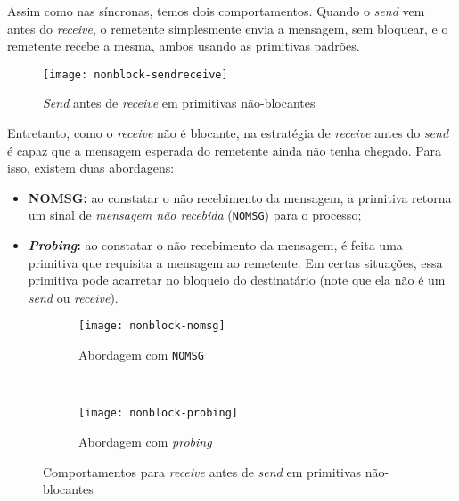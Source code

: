 Assim como nas síncronas, temos dois comportamentos. Quando o \textit{send} vem antes do \textit{receive}, o remetente simplesmente envia a mensagem, sem bloquear, e o remetente recebe a mesma, ambos usando as primitivas padrões.

\begin{figure}[ht]
  \centering
  \texttt{[image: nonblock-sendreceive]}
  \caption{\textit{Send} antes de \textit{receive} em primitivas não-blocantes}
  \label{fig:nonblock-sendreceive}
\end{figure}

Entretanto, como o \textit{receive} não é blocante, na estratégia de \textit{receive} antes do \textit{send} é capaz que a mensagem esperada do remetente ainda não tenha chegado. Para isso, existem duas abordagens:

\begin{itemize}
  \item \textbf{NOMSG:} ao constatar o não recebimento da mensagem, a primitiva retorna um sinal de \textit{mensagem não recebida} (\texttt{NOMSG}) para o processo;

  \item \textbf{\textit{Probing}:} ao constatar o não recebimento da mensagem, é feita uma primitiva que requisita a mensagem ao remetente. Em certas situações, essa primitiva pode acarretar no bloqueio do destinatário (note que ela não é um \textit{send} ou \textit{receive}).
\end{itemize}

\begin{figure*}[ht]
  \begin{subfigure}{0.5\textwidth}
    \centering
    \texttt{[image: nonblock-nomsg]}
    \caption{Abordagem com \texttt{NOMSG}}
    \label{subfig:nonblock-nomsg}
  \end{subfigure}
  ~
  \begin{subfigure}{0.5\textwidth}
    \centering
    \texttt{[image: nonblock-probing]}
    \caption{Abordagem com \textit{probing}}
    \label{subfig:nonblock-probing}
  \end{subfigure}

  \caption{Comportamentos para \textit{receive} antes de \textit{send} em primitivas não-blocantes}
  \label{fig:messages-nonblock}
\end{figure*}
